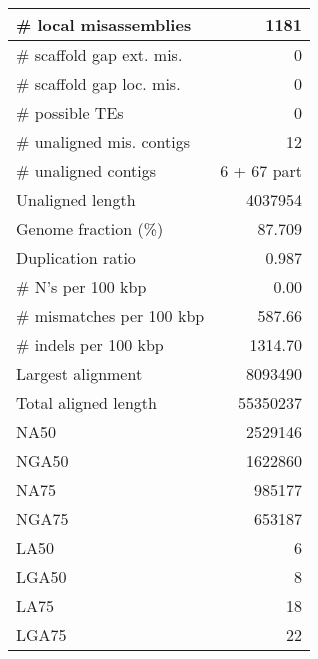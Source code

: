 \documentclass[12pt,a4paper]{article}
\begin{document}
\begin{table}[ht]
\begin{center}
\begin{tabular}{|l*{1}{|r}|}
\# local misassemblies & 1181 \\ \hline
\# scaffold gap ext. mis. & 0 \\ \hline
\# scaffold gap loc. mis. & 0 \\ \hline
\# possible TEs & 0 \\ \hline
\# unaligned mis. contigs & 12 \\ \hline
\# unaligned contigs & 6 + 67 part \\ \hline
Unaligned length & 4037954 \\ \hline
Genome fraction (\%) & 87.709 \\ \hline
Duplication ratio & 0.987 \\ \hline
\# N's per 100 kbp & 0.00 \\ \hline
\# mismatches per 100 kbp & 587.66 \\ \hline
\# indels per 100 kbp & 1314.70 \\ \hline
Largest alignment & 8093490 \\ \hline
Total aligned length & 55350237 \\ \hline
NA50 & 2529146 \\ \hline
NGA50 & 1622860 \\ \hline
NA75 & 985177 \\ \hline
NGA75 & 653187 \\ \hline
LA50 & 6 \\ \hline
LGA50 & 8 \\ \hline
LA75 & 18 \\ \hline
LGA75 & 22 \\ \hline
\end{tabular}
\end{center}
\end{table}
\end{document}
